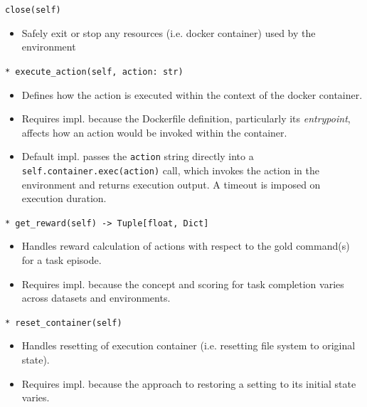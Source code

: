 \texttt{close(self)}
\begin{itemize}[noitemsep,topsep=0pt]
    \item Safely exit or stop any resources (i.e. docker container) used by the environment
\end{itemize}

\texttt{* execute\_action(self, action: str)}
\begin{itemize}[noitemsep,topsep=0pt]
    \item Defines how the action is executed within the context of the docker container.
    \item Requires impl. because the Dockerfile definition, particularly its \textit{entrypoint}, affects how an action would be invoked within the container.
    \item Default impl. passes the \texttt{action} string directly into a \texttt{self.container.exec(action)} call, which invokes the action in the environment and returns execution output. A timeout is imposed on execution duration.
\end{itemize}

\texttt{* get\_reward(self) -> Tuple[float, Dict]}
\begin{itemize}[noitemsep,topsep=0pt]
    \item Handles reward calculation of actions with respect to the gold command(s) for a task episode.
    \item Requires impl. because the concept and scoring for task completion varies across datasets and environments.
\end{itemize}

\texttt{* reset\_container(self)}
\begin{itemize}[noitemsep,topsep=0pt]
    \item Handles resetting of execution container (i.e. resetting file system to original state).
    \item Requires impl. because the approach to restoring a setting to its initial state varies.
\end{itemize}